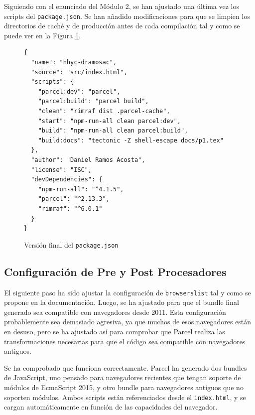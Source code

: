 \documentclass{article}
\begin{document}
Siguiendo con el enunciado del Módulo 2, se han ajustado una última vez los scripts del \lstinline|package.json|.
Se han añadido modificaciones para que se limpien los directorios de caché y de producción antes de cada compilación tal y como se puede ver en la Figura \ref{fig:package-json}.

\begin{figure}[h!]
\begin{verbatim}
{
  "name": "hhyc-dramosac",
  "source": "src/index.html",
  "scripts": {
    "parcel:dev": "parcel",
    "parcel:build": "parcel build",
    "clean": "rimraf dist .parcel-cache",
    "start": "npm-run-all clean parcel:dev",
    "build": "npm-run-all clean parcel:build",
    "build:docs": "tectonic -Z shell-escape docs/p1.tex"
  },
  "author": "Daniel Ramos Acosta",
  "license": "ISC",
  "devDependencies": {
    "npm-run-all": "^4.1.5",
    "parcel": "^2.13.3",
    "rimraf": "^6.0.1"
  }
}
\end{verbatim}
\caption{Versión final del \lstinline{package.json}}
\label{fig:package-json}
\end{figure}

\subsection{Configuración de Pre y Post Procesadores}\label{subsec:configuracion-de-pre-y-post-procesadores}

El siguiente paso ha sido ajustar la configuración de \lstinline|browserslist| tal y como se propone en la documentación.
Luego, se ha ajustado para que el bundle final generado sea compatible con navegadores desde 2011.
Esta configuración probablemente sea demasiado agresiva, ya que muchos de esos navegadores están en desuso, pero se ha ajustado así para comprobar que Parcel realiza las transformaciones necesarias para que el código sea compatible con navegadores antiguos.

Se ha comprobado que funciona correctamente.
Parcel ha generado dos bundles de JavaScript, uno pensado para navegadores recientes que tengan soporte de módulos de EcmaScript 2015, y otro bundle para navegadores antiguos que no soporten módulos.
Ambos scripts están referenciados desde el \lstinline|index.html|, y se cargan automáticamente en función de las capacidades del navegador.
\end{document}
